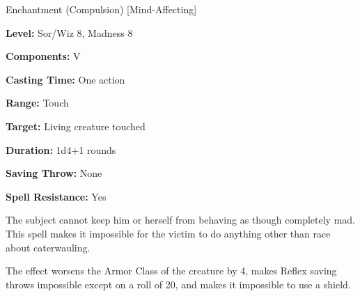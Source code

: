 
Enchantment (Compulsion) [Mind-Affecting]

\textbf{Level:} Sor/Wiz 8, Madness 8

\textbf{Components:} V

\textbf{Casting Time:} One action

\textbf{Range:} Touch

\textbf{Target:} Living creature touched

\textbf{Duration:} 1d4+1 rounds

\textbf{Saving Throw:} None

\textbf{Spell Resistance:} Yes

The subject cannot keep him or herself from behaving as though completely mad. 
This spell makes it impossible for the victim to do anything other than race about 
caterwauling.

The effect worsens the Armor Class of the creature by 4, makes Reflex saving throws 
impossible except on a roll of 20, and makes it impossible to use a shield.

